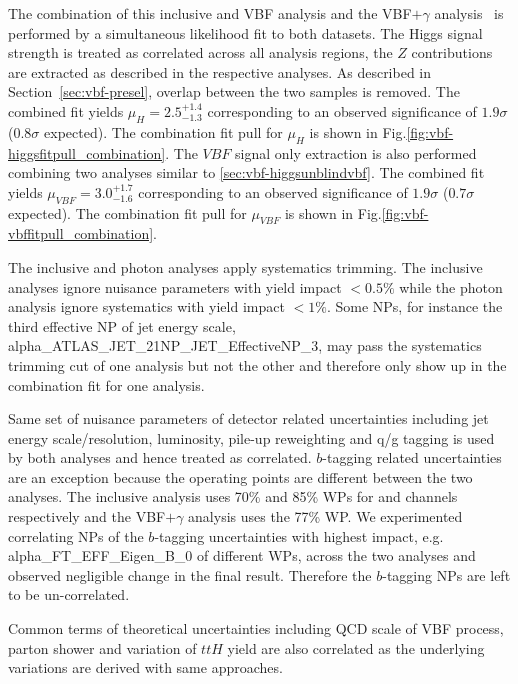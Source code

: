 The combination of this inclusive \twocentral and \fourcentral VBF analysis and the VBF$+\gamma$ analysis~\cite{vbfplusgammaint} is performed by a simultaneous likelihood fit to both datasets. The Higgs signal strength is treated as correlated across all analysis regions, the $Z$ contributions are extracted as described in the respective analyses.  As described in Section~\ref{sec:vbf-presel}, overlap between the two samples is removed. The combined fit yields $\mu_H = 2.5^{+1.4}_{-1.3}$ corresponding to an observed significance of $1.9\sigma$ ($0.8\sigma$ expected). The combination fit pull for $\mu_H$ is shown in Fig.\ref{fig:vbf-higgsfitpull_combination}. The $VBF$ signal only extraction is also performed combining two analyses similar to \ref{sec:vbf-higgsunblindvbf}. The combined fit yields $\mu_{VBF} =3.0^{+1.7}_{-1.6}$ corresponding to an observed significance of $1.9\sigma$ ($0.7\sigma$ expected). The combination fit pull for $\mu_{VBF}$ is shown in Fig.\ref{fig:vbf-vbffitpull_combination}.



The inclusive and photon analyses apply systematics trimming. The inclusive analyses ignore nuisance parameters with yield impact $<0.5\%$ while the photon analysis ignore systematics with yield impact $<1\%$. Some NPs, for instance the third effective NP of jet energy scale, alpha\_ATLAS\_JET\_21NP\_JET\_EffectiveNP\_3, may pass the systematics trimming cut of one analysis but not the other and therefore only show up in the combination fit for one analysis. 

Same set of nuisance parameters of detector related uncertainties including jet energy scale/resolution, luminosity, pile-up reweighting and q/g tagging is used by both analyses and hence treated as correlated.  $b$-tagging related uncertainties are an exception because the operating points are different between the two analyses. The inclusive analysis uses 70\% and 85\% WPs for \twocentral and \fourcentral channels respectively and the VBF$+\gamma$ analysis uses the 77\% WP. We experimented correlating NPs of the $b$-tagging uncertainties with highest impact, e.g. alpha\_FT\_EFF\_Eigen\_B\_0 of different WPs, across the two analyses and observed negligible change in the final result. Therefore the $b$-tagging NPs are left to be un-correlated.

Common terms of theoretical uncertainties including QCD scale of VBF process, parton shower and variation of $ttH$ yield are also correlated as the underlying variations are derived with same approaches. 

